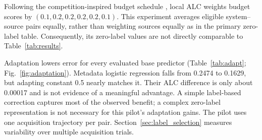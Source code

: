 \documentclass[conference]{IEEEtran}
\begin{document}
Following the competition-inspired budget schedule \cite{aims}, local ALC weights budget scores by $(0.1,0.2,0.2,0.2,0.2,0.1)$. This experiment averages eligible system--source pairs equally, rather than weighting sources equally as in the primary zero-label table. Consequently, its zero-label values are not directly comparable to Table~\ref{tab:results}.

Adaptation lowers error for every evaluated base predictor (Table~\ref{tab:adapt}; Fig.~\ref{fig:adaptation}). Metadata logistic regression falls from 0.2474 to 0.1629, but adapting constant 0.5 nearly matches it. Their ALC difference is only about 0.00017 and is not evidence of a meaningful advantage. A simple label-based correction captures most of the observed benefit; a complex zero-label representation is not necessary for this pilot's adaptation gains. The pilot uses one acquisition trajectory per pair. Section~\ref{sec:label_selection} measures variability over multiple acquisition trials.
\end{document}
